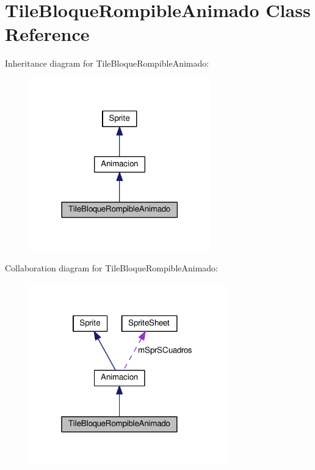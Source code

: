 \hypertarget{class_tile_bloque_rompible_animado}{}\section{Tile\+Bloque\+Rompible\+Animado Class Reference}
\label{class_tile_bloque_rompible_animado}


Inheritance diagram for Tile\+Bloque\+Rompible\+Animado\+:
\nopagebreak
\begin{figure}[H]
\begin{center}
\leavevmode
\includegraphics[width=222pt]{class_tile_bloque_rompible_animado__inherit__graph}
\end{center}
\end{figure}


Collaboration diagram for Tile\+Bloque\+Rompible\+Animado\+:
\nopagebreak
\begin{figure}[H]
\begin{center}
\leavevmode
\includegraphics[width=241pt]{class_tile_bloque_rompible_animado__coll__graph}
\end{center}
\end{figure}
